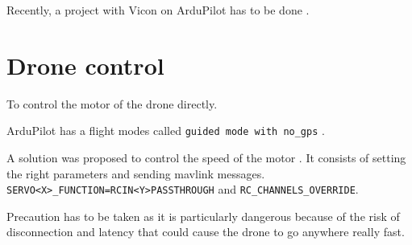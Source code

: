 Recently, a project with Vicon on ArduPilot has to be done \cite{ardupilot_vicon}.

\section{Drone control}
To control the motor of the drone directly.

ArduPilot has a flight modes called \texttt{guided mode with no\_gps} \cite{ardupilot_flight_modes}.

A solution was proposed to control the speed of the motor \cite{github_ardupilot_11859}.
It consists of setting the right parameters and sending mavlink messages.
\texttt{SERVO<X>\_FUNCTION=RCIN<Y>PASSTHROUGH} and \texttt{RC\_CHANNELS\_OVERRIDE}.

Precaution has to be taken as it is particularly dangerous because of the risk of disconnection and latency that could cause the drone to go anywhere really fast.

